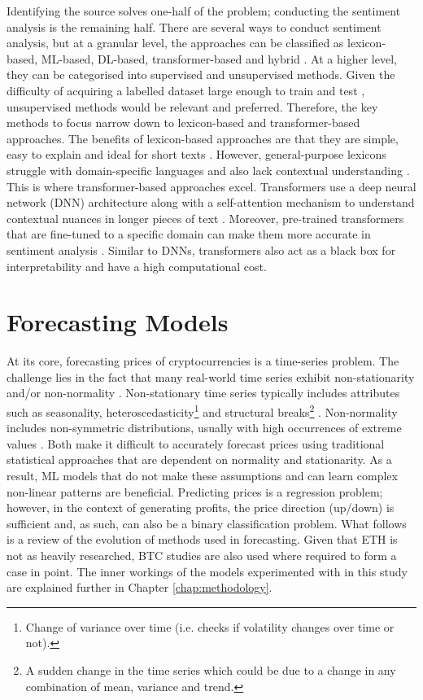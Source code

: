 \documentclass[ %
                    author={Raj Dhakan},
                supervisor={Dr. Ayush Joshi},
                    degree={MSc},
                     title={Ethereum Price Prediction using Internal and External Factors},
                  subtitle={},
                      type={},
                      year={2025}]{dissertation}
\begin{document}
Identifying the source solves one-half of the problem; conducting the sentiment analysis is the remaining half. There are several ways to conduct sentiment analysis, but at a granular level, the approaches can be classified as lexicon-based, ML-based, DL-based, transformer-based and hybrid \cite{kumar2025evolving}. At a higher level, they can be categorised into supervised and unsupervised methods. Given the difficulty of acquiring a labelled dataset large enough to train and test \cite{araci2019finbert}, unsupervised methods would be relevant and preferred. Therefore, the key methods to focus narrow down to lexicon-based and transformer-based approaches. The benefits of lexicon-based approaches are that they are simple, easy to explain and ideal for short texts \cite{birjali2021comprehensive}. However, general-purpose lexicons struggle with domain-specific languages and also lack contextual understanding \cite{birjali2021comprehensive}. This is where transformer-based approaches excel. Transformers use a deep neural network (DNN) architecture along with a self-attention mechanism to understand contextual nuances in longer pieces of text \cite{kumar2025evolving}. Moreover, pre-trained transformers that are fine-tuned to a specific domain can make them more accurate in sentiment analysis \cite{kumar2025evolving}. Similar to DNNs, transformers also act as a black box for interpretability and have a high computational cost.

\section{Forecasting Models}
At its core, forecasting prices of cryptocurrencies is a time-series problem. The challenge lies in the fact that many real-world time series exhibit non-stationarity and/or non-normality \cite{hewamalage2023forecast}. Non-stationary time series typically includes attributes such as seasonality,  heteroscedasticity\footnote{Change of variance over time (i.e. checks if volatility changes over time or not).} and structural breaks\footnote{A sudden change in the time series which could be due to a change in any combination of mean, variance and trend.} \cite{hewamalage2023forecast}. Non-normality includes non-symmetric distributions, usually with high occurrences of extreme values \cite{hewamalage2023forecast}. Both make it difficult to accurately forecast prices using traditional statistical approaches that are dependent on normality and stationarity. As a result, ML models that do not make these assumptions and can learn complex non-linear patterns are beneficial. Predicting prices is a regression problem; however, in the context of generating profits, the price direction (up/down) is sufficient and, as such, can also be a binary classification problem. What follows is a review of the evolution of methods used in forecasting. Given that ETH is not as heavily researched, BTC studies are also used where required to form a case in point. The inner workings of the models experimented with in this study are explained further in Chapter \ref{chap:methodology}.
\end{document}
